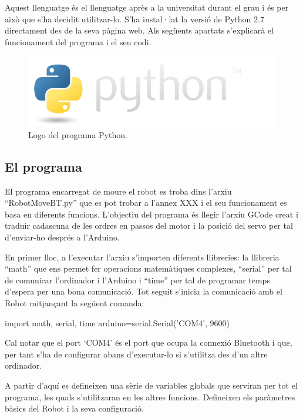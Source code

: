 Aquest llenguatge és el llenguatge après a la universitat durant el grau i és per això que s’ha decidit utilitzar-lo. S’ha instal·lat la versió de Python 2.7 directament des de la seva pàgina web. Als següents apartats s’explicarà el funcionament del programa i el seu codi. 

\begin{figure}[H]
	\centering
	\includegraphics[scale=0.5]{python-logo.png}
	\caption{Logo del programa Python.}
	\label{fig:pythonlogo}
\end{figure}

\subsection{El programa}\label{sec:robotmoveBT}

El programa encarregat de moure el robot es troba dins l’arxiu “RobotMoveBT.py” que es pot trobar a l’annex XXX i el seu funcionament es basa en diferents funcions. L’objectiu del programa és llegir l’arxiu GCode creat i traduir cadascuna de les ordres en passos del motor i la posició del servo per tal d’enviar-ho després a l’Arduino. 

En primer lloc, a l'executar l’arxiu s’importen diferents llibreries: la llibreria “math” que ens permet fer operacions matemàtiques complexes, “serial” per tal de comunicar l’ordinador i l’Arduino i “time” per tal de programar temps d’espera per una bona comunicació. Tot seguit s’inicia la comunicació amb el Robot mitjançant la següent comanda:

\begin{python}
	import math, serial, time
	arduino=serial.Serial('COM4', 9600)
\end{python}

Cal notar que el port ‘COM4’ és el port que ocupa la connexió Bluetooth i que, per tant s’ha de configurar abans d’executar-lo si s’utilitza des d’un altre ordinador. 

A partir d’aquí es defineixen una sèrie de variables globals que serviran per tot el programa, les quals s’utilitzaran en les altres funcions. Defineixen els paràmetres bàsics del Robot i la seva configuració. 

